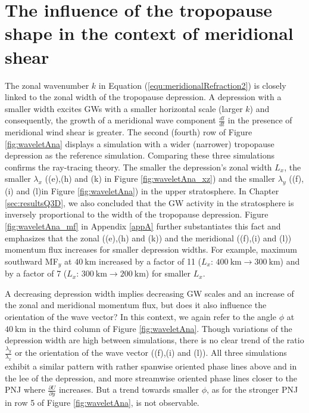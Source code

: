 
\section{The influence of the tropopause shape in the context of meridional shear}
\label{sec:3D_shape}
The zonal wavenumber $k$ in Equation (\ref{equ:meridionalRefraction2}) is closely linked to the zonal width of the tropopause depression. A depression with a smaller width excites GWs with a smaller horizontal scale (larger $k$) and consequently, the growth of a meridional wave component $\frac{dl}{dt}$ in the presence of meridional wind shear is greater. The second (fourth) row of Figure \ref{fig:waveletAna} displays a simulation with a wider (narrower) tropopause depression as the reference simulation. Comparing these three simulations confirms the ray-tracing theory. The smaller the depression's zonal width $L_x$, the smaller $\lambda_x$ ((e),(h) and (k) in Figure \ref{fig:waveletAna_xz}) and the smaller $\lambda_y$ ((f),(i) and (l)in Figure \ref{fig:waveletAna}) in the upper stratosphere. In Chapter \ref{sec:resultsQ3D}, we also concluded that the GW activity in the stratosphere is inversely proportional to the width of the tropopause depression. Figure \ref{fig:waveletAna_mf} in Appendix \ref{appA} further substantiates this fact and emphasizes that the zonal ((e),(h) and (k)) and the meridional ((f),(i) and (l)) momentum flux increases for smaller depression widths. For example, maximum southward MF$_y$ at $\SI{40}{\kilo\meter}$ increased by a factor of 11 ($L_x$: $\SI{400}{\kilo\meter} \rightarrow \SI{300}{\kilo\meter}$) and by a factor of 7 ($L_x$: $\SI{300}{\kilo\meter} \rightarrow \SI{200}{\kilo\meter}$) for smaller $L_x$.   

A decreasing depression width implies decreasing GW scales and an increase of the zonal and meridional momentum flux, but does it also influence the orientation of the wave vector? In this context, we again refer to the angle $\phi$ at $\SI{40}{\kilo\meter}$ in the third column of Figure \ref{fig:waveletAna}. Though variations of the depression width are high between simulations, there is no clear trend of the ratio $\frac{\lambda_y}{\lambda_x}$ or the orientation of the wave vector ((f),(i) and (l)). All three simulations exhibit a similar pattern with rather spanwise oriented phase lines above and in the lee of the depression, and more streamwise oriented phase lines closer to the PNJ where $\frac{\partial U}{\partial y}$ increases. But a trend towards smaller $\phi$, as for the stronger PNJ in row 5 of Figure \ref{fig:waveletAna}, is not observable.

